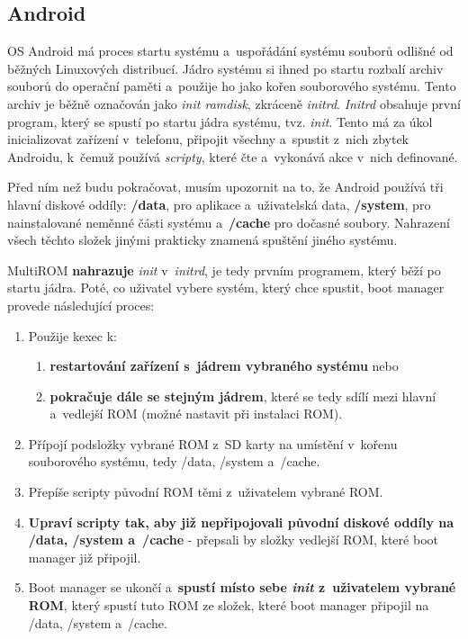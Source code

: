 \documentclass[12pt, a4paper, oneside]{article}
\newcommand{\B}{\textbf} %
\newcommand{\It}{\textit}  %
\begin{document}
\subsection{Android}
OS Android má proces startu systému a~uspořádání systému souborů odlišné od běžných Linuxových distribucí. Jádro systému si ihned po startu rozbalí archiv souborů do operační paměti a~použije ho jako kořen souborového systému. Tento archiv je běžně označován jako \It{init ramdisk}, zkráceně \It{initrd}. \It{Initrd} obsahuje první program, který se spustí po startu jádra systému, tvz. \It{init}. Tento má za úkol inicializovat zařízení v~telefonu, připojit všechny  a~spustit z~nich zbytek Androidu, k~čemuž používá \It{scripty}, které čte a~vykonává akce v~nich definované.

Před ním než budu pokračovat, musím upozornit na to, že Android používá tři hlavní diskové oddíly: \B{/data}, pro aplikace a~uživatelská data, \B{/system}, pro nainstalované neměnné části systému a~\B{/cache} pro dočasné soubory. Nahrazení všech těchto složek jinými prakticky znamená spuštění jiného systému.

MultiROM \B{nahrazuje} \It{init} v~\It{initrd}, je tedy prvním programem, který běží po startu jádra. Poté, co uživatel vybere systém, který chce spustit, boot manager provede následující proces:

\begin{enumerate}
    \item Použije kexec k:
    \begin{enumerate}
        \item \B{restartování zařízení s~jádrem vybraného systému} nebo
        \item \B{pokračuje dále se stejným jádrem}, které se tedy sdílí mezi hlavní a~vedlejší ROM (možné nastavit při instalaci ROM).
    \end{enumerate}
    \item Přípojí podsložky vybrané ROM z~SD karty na umístění v~kořenu souborového systému, tedy /data, /system a~/cache.
    \item Přepíše scripty původní ROM těmi z~uživatelem vybrané ROM.
    \item \B{Upraví scripty tak, aby již nepřipojovali původní diskové oddíly na /data, /system a~/cache} - přepsali by složky vedlejší ROM, které boot manager již připojil.
    \item Boot manager se ukončí a~\B{spustí místo sebe \It{init} z~uživatelem vybrané ROM}, který spustí tuto ROM ze složek, které boot manager připojil na /data, /system a~/cache.
\end{enumerate}
\end{document}
